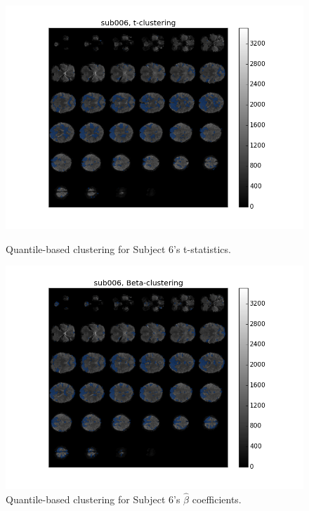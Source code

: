 \begin{figure}[ht]
\centering
\begin{minipage}[b]{.4\linewidth}
	\centering
	\includegraphics[width=.8\linewidth]{../images/sub006_t_overlay.png} 
	\caption{Quantile-based clustering for Subject 6's t-statistics.}
	\label{fig:clustert}
\end{minipage}	

\begin{minipage}[b]{.4\linewidth}
	\centering
		\includegraphics[width=.8\linewidth]{../images/sub006_beta_overlay.png} 
	\caption{Quantile-based clustering for Subject 6's $\hat{\beta}$ coefficients.}
	\label{fig:clusterbeta}
\end{minipage}


\end{figure}
